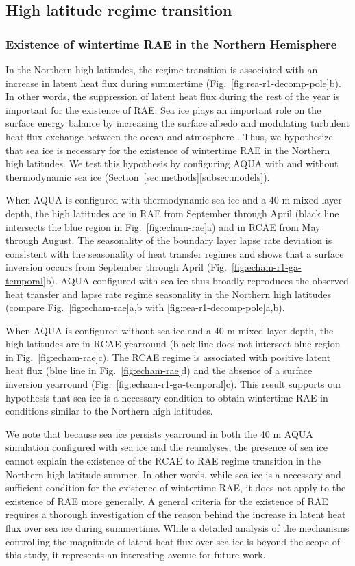 \documentclass{ametsocV5}
\begin{document}
  \subsection{High latitude regime transition} \label{subsec:ice}
  \subsubsection{Existence of wintertime RAE in the Northern Hemisphere}
  In the Northern high latitudes, the regime transition is associated with an increase in latent heat flux during summertime (Fig.~\ref{fig:rea-r1-decomp-pole}b). In other words, the suppression of latent heat flux during the rest of the year is important for the existence of RAE. Sea ice plays an important role on the surface energy balance by increasing the surface albedo and modulating turbulent heat flux exchange between the ocean and atmosphere \citep{andreas1979, maykut1982}. Thus, we hypothesize that sea ice is necessary for the existence of wintertime RAE in the Northern high latitudes. We test this hypothesis by configuring AQUA with and without thermodynamic sea ice (Section~\ref{sec:methods}\ref{subsec:models}). 

  When AQUA is configured with thermodynamic sea ice and a 40 m mixed layer depth, the high latitudes are in RAE from September through April (black line intersects the blue region in Fig.~\ref{fig:echam-rae}a) and in RCAE from May through August. The seasonality of the boundary layer lapse rate deviation is consistent with the seasonality of heat transfer regimes and shows that a surface inversion occurs from September through April (Fig.~\ref{fig:echam-r1-ga-temporal}b). AQUA configured with sea ice thus broadly reproduces the observed heat transfer and lapse rate regime seasonality in the Northern high latitudes (compare Fig.~\ref{fig:echam-rae}a,b with \ref{fig:rea-r1-decomp-pole}a,b).
  
  When AQUA is configured without sea ice and a 40 m mixed layer depth, the high latitudes are in RCAE yearround (black line does not intersect blue region in Fig.~\ref{fig:echam-rae}c). The RCAE regime is associated with positive latent heat flux (blue line in Fig.~\ref{fig:echam-rae}d) and the absence of a surface inversion yearround (Fig.~\ref{fig:echam-r1-ga-temporal}c). This result supports our hypothesis that sea ice is a necessary condition to obtain wintertime RAE in conditions similar to the Northern high latitudes. 
  
  We note that because sea ice persists yearround in both the 40 m AQUA simulation configured with sea ice and the reanalyses, the presence of sea ice cannot explain the existence of the RCAE to RAE regime transition in the Northern high latitude summer. In other words, while sea ice is a necessary and sufficient condition for the existence of wintertime RAE, it does not apply to the existence of RAE more generally. A general criteria for the existence of RAE requires a thorough investigation of the reason behind the increase in latent heat flux over sea ice during summertime. While a detailed analysis of the mechanisms controlling the magnitude of latent heat flux over sea ice is beyond the scope of this study, it represents an interesting avenue for future work.
\end{document}

